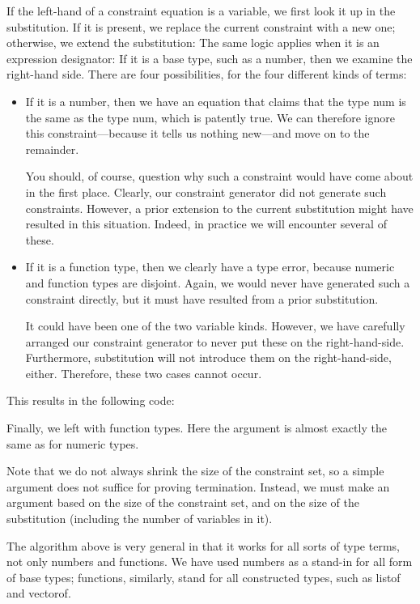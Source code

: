 If the left-hand of a constraint equation is a variable, we first look it up in
the substitution. If it is present, we replace the current constraint with a new
one; otherwise, we extend the substitution:
The same logic applies when it is an expression designator:
If it is a base type, such as a number, then we examine the right-hand side.
There are four possibilities, for the four different kinds of terms:
\begin{itemize}
  \item 
If it is a number, then we have an equation that claims that the type num is the
same as the type num, which is patently true. We can therefore ignore this
constraint—because it tells us nothing new—and move on to the remainder.

You should, of course, question why such a constraint would have come about in
the first place. Clearly, our constraint generator did not generate such
constraints. However, a prior extension to the current substitution might have
resulted in this situation. Indeed, in practice we will encounter several of
these.

  \item 
If it is a function type, then we clearly have a type error, because numeric and
function types are disjoint. Again, we would never have generated such a
constraint directly, but it must have resulted from a prior substitution.

It could have been one of the two variable kinds. However, we have carefully
arranged our constraint generator to never put these on the right-hand-side.
Furthermore, substitution will not introduce them on the right-hand-side,
either. Therefore, these two cases cannot occur.
\end{itemize}
This results in the following code:

Finally, we left with function types. Here the argument is almost exactly the
same as for numeric types.

Note that we do not always shrink the size of the constraint set, so a simple
argument does not suffice for proving termination. Instead, we must make an
argument based on the size of the constraint set, and on the size of the
substitution (including the number of variables in it).

The algorithm above is very general in that it works for all sorts of type
terms, not only numbers and functions. We have used numbers as a stand-in for
all form of base types; functions, similarly, stand for all constructed types,
such as listof and vectorof.


